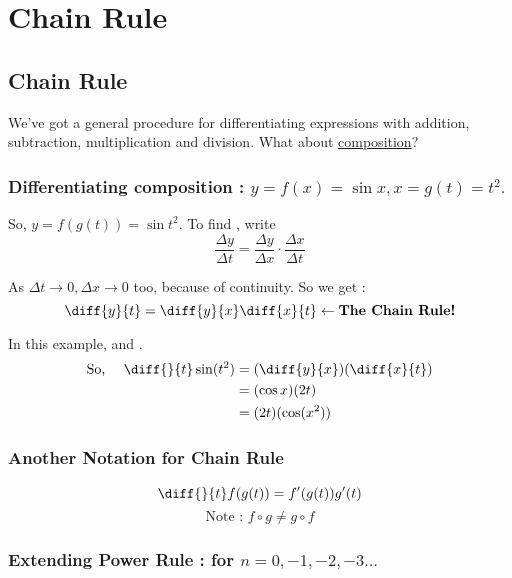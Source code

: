 

\chapter{Chain Rule}

\bigbreak
\section{Chain Rule}

We've got a general procedure for differentiating expressions with addition, subtraction, multiplication and division.
What about \underline{composition}?

\subsection{Differentiating composition : $y = f(x) = \sin x , x = g(t) = t^2.$}

So, $y = f(g(t)) = \sin t^2$. To find , write
$$ \frac{\Delta y}{\Delta t} = \frac{\Delta y}{\Delta x} \cdot \frac{\Delta x}{\Delta t} $$

As $\Delta t \to 0, \Delta x \to 0$ too, because of continuity. So we get :
$$ \diff{y}{t} = \diff{y}{x} \diff{x}{t} \leftarrow \textbf{The Chain Rule!} $$

In this example,  and .
\begin{align*}
	\text{So, $\quad$} \diff{}{t} \sin(t^2)
		& = (\diff{y}{x})(\diff{x}{t}) \\
		& = (\cos x)(2t) \\
		& = (2t)(\cos(x^2)) \\
\end{align*}

\subsection{Another Notation for Chain Rule}

$$ \diff{}{t}f(g(t)) = f'(g(t))g'(t) $$
$$ \text{Note : } f \circ g \neq g \circ f $$

\subsection{Extending Power Rule :  for $n = 0, -1, -2, -3\ldots$}

